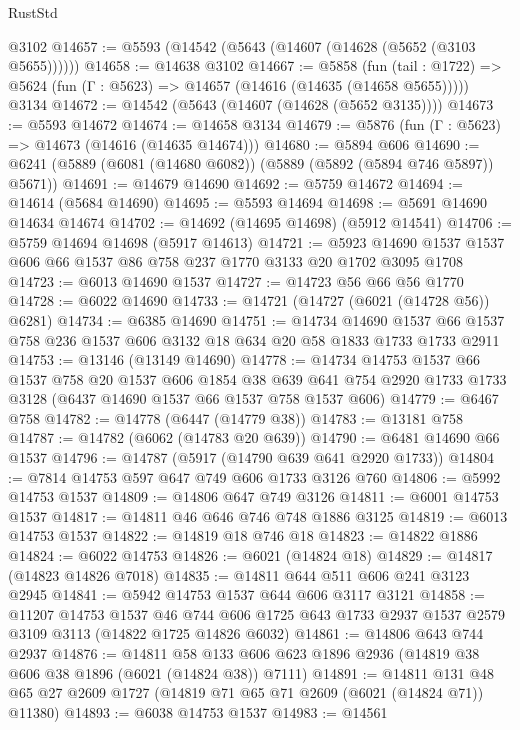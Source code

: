 \begin{lexlean}{RustStd}
\begin{coremodule}
    @3102
@14657 := @5593 (@14542 (@5643 (@14607 (@14628 (@5652 (@3103 @5655))))))
@14658 := @14638 @3102
@14667 := @5858
    (fun (tail : @1722) => @5624 (fun (Γ : @5623) => @14657 (@14616 (@14635 (@14658 @5655)))))
    @3134
@14672 := @14542 (@5643 (@14607 (@14628 (@5652 @3135))))
@14673 := @5593 @14672
@14674 := @14658 @3134
@14679 := @5876 (fun (Γ : @5623) => @14673 (@14616 (@14635 @14674)))
@14680 := @5894 @606
@14690 := @6241 (@5889 (@6081 (@14680 @6082)) (@5889 (@5892 (@5894 @746 @5897)) @5671))
@14691 := @14679 @14690
@14692 := @5759 @14672
@14694 := @14614 (@5684 @14690)
@14695 := @5593 @14694
@14698 := @5691 @14690 @14634 @14674
@14702 := @14692 (@14695 @14698) (@5912 @14541)
@14706 := @5759 @14694 @14698 (@5917 @14613)
@14721 := @5923 @14690 @1537 @1537 @606 @66 @1537 @86 @758 @237 @1770 @3133 @20 @1702 @3095 @1708
@14723 := @6013 @14690 @1537
@14727 := @14723 @56 @66 @56 @1770
@14728 := @6022 @14690
@14733 := @14721 (@14727 (@6021 (@14728 @56)) @6281)
@14734 := @6385 @14690
@14751 := @14734
    @14690
    @1537
    @66
    @1537
    @758
    @236
    @1537
    @606
    @3132
    @18
    @634
    @20
    @58
    @1833
    @1733
    @1733
    @2911
@14753 := @13146 (@13149 @14690)
@14778 := @14734
    @14753
    @1537
    @66
    @1537
    @758
    @20
    @1537
    @606
    @1854
    @38
    @639
    @641
    @754
    @2920
    @1733
    @1733
    @3128
    (@6437 @14690 @1537 @66 @1537 @758 @1537 @606)
@14779 := @6467 @758
@14782 := @14778 (@6447 (@14779 @38))
@14783 := @13181 @758
@14787 := @14782 (@6062 (@14783 @20 @639))
@14790 := @6481 @14690 @66 @1537
@14796 := @14787 (@5917 (@14790 @639 @641 @2920 @1733))
@14804 := @7814 @14753 @597 @647 @749 @606 @1733 @3126 @760
@14806 := @5992 @14753 @1537
@14809 := @14806 @647 @749 @3126
@14811 := @6001 @14753 @1537
@14817 := @14811 @46 @646 @746 @748 @1886 @3125
@14819 := @6013 @14753 @1537
@14822 := @14819 @18 @746 @18
@14823 := @14822 @1886
@14824 := @6022 @14753
@14826 := @6021 (@14824 @18)
@14829 := @14817 (@14823 @14826 @7018)
@14835 := @14811 @644 @511 @606 @241 @3123 @2945
@14841 := @5942 @14753 @1537 @644 @606 @3117 @3121
@14858 := @11207
    @14753
    @1537
    @46
    @744
    @606
    @1725
    @643
    @1733
    @2937
    @1537
    @2579
    @3109
    @3113
    (@14822 @1725 @14826 @6032)
@14861 := @14806 @643 @744 @2937
@14876 := @14811
    @58
    @133
    @606
    @623
    @1896
    @2936
    (@14819 @38 @606 @38 @1896 (@6021 (@14824 @38)) @7111)
@14891 := @14811 @131 @48 @65 @27 @2609 @1727 (@14819 @71 @65 @71 @2609 (@6021 (@14824 @71)) @11380)
@14893 := @6038 @14753 @1537
@14983 := @14561

\end{coremodule}
\end{lexlean}
